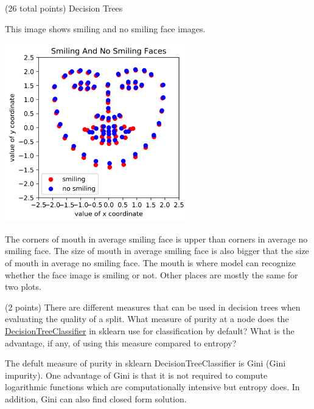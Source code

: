 \documentclass[12pt]{article}
\begin{document}
\begin{question}{(26 total points) Decision Trees}
\begin{subquestion}
\begin{answerbox}{35em}
This image shows smiling and no smiling face images.
\begin{center}
\includegraphics[width=0.6\textwidth]{smiling.png}
\end{center}
The corners of mouth in average smiling face is upper than corners in average no smiling face. The size of mouth in average smiling face is also bigger that the size of mouth in average no smiling face. The mouth is where model can recognize whether the face image is smiling or not. Other places are mostly the same for two plots. 
\end{answerbox}



\end{subquestion}


%
%
\begin{subquestion}{(2 points) 
There are different measures that can be used in decision trees when evaluating the quality of a split. 
What measure of purity at a node does the \href{https://scikit-learn.org/0.19/modules/generated/sklearn.tree.DecisionTreeClassifier.html}{DecisionTreeClassifier} in sklearn use for classification by default? 
What is the advantage, if any, of using this measure compared to entropy? 
}


\begin{answerbox}{10em}
The defult measure of purity in sklearn DecisionTreeClassifier is Gini (Gini impurity). One advantage of Gini is that it is not required to compute logarithmic functions which are computationally intensive but entropy does. In addition, Gini can also find closed form solution.
\end{answerbox}



\end{subquestion}



\end{question}
\end{document}
